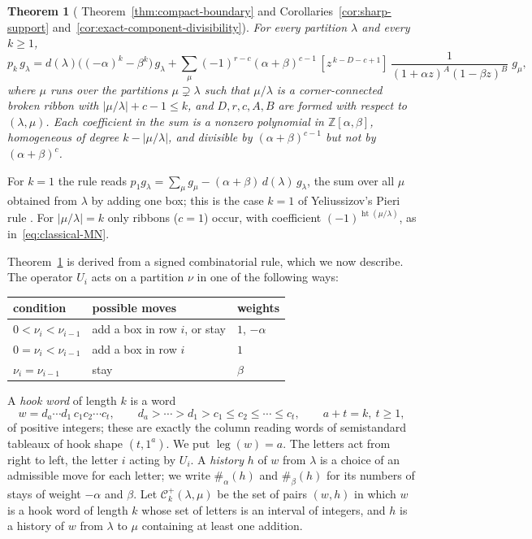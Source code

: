 \documentclass[11pt]{amsart}
\numberwithin{equation}{section}
\newtheorem{maintheorem}{Theorem}
\theoremstyle{definition}
\theoremstyle{remark}
\newcommand{\leg}{\operatorname{leg}}
\newcommand{\hgt}{\operatorname{ht}}
\newcommand{\cC}{\mathcal C}
\newcommand{\ZZ}{\mathbb Z}
\begin{document}
\begin{maintheorem}[
Theorem~\ref{thm:compact-boundary} and
Corollaries~\ref{cor:sharp-support}
and~\ref{cor:exact-component-divisibility}]
\label{thm:A}
For every partition $\lambda$ and every $k\geq1$,
\[
 p_k\,g_\lambda=d(\lambda)\bigl((-\alpha)^k-\beta^k\bigr)\,g_\lambda
 +\sum_\mu(-1)^{r-c}(\alpha+\beta)^{c-1}\,
 [z^{\,k-D-c+1}]\,\frac{1}{(1+\alpha z)^A(1-\beta z)^B}\;g_\mu ,
\]
where $\mu$ runs over the partitions $\mu\supsetneq\lambda$ such that
$\mu/\lambda$ is a corner-connected broken ribbon with
$|\mu/\lambda|+c-1\leq k$, and $D,r,c,A,B$ are formed with respect to
$(\lambda,\mu)$. Each coefficient in the sum is a nonzero polynomial in
$\ZZ[\alpha,\beta]$, homogeneous of degree $k-|\mu/\lambda|$,
and divisible by $(\alpha+\beta)^{c-1}$ but not by
$(\alpha+\beta)^c$.
\end{maintheorem}

For $k=1$ the rule reads
$p_1g_\lambda=\sum_\mu g_\mu-(\alpha+\beta)\,d(\lambda)\,g_\lambda$, the sum
over all $\mu$ obtained from $\lambda$ by adding one box; this is the case
$k=1$ of Yeliussizov's Pieri rule \cite[Prop.~8.12]{Yeliussizov}. For
$|\mu/\lambda|=k$ only ribbons ($c=1$) occur, with coefficient
$(-1)^{\hgt(\mu/\lambda)}$, as in~\eqref{eq:classical-MN}.

Theorem~\ref{thm:A} is derived from a signed combinatorial rule, which we
now describe. The operator $U_i$ acts on a partition $\nu$ in one of the
following ways:
\begin{center}
\renewcommand{\arraystretch}{1.15}
\begin{tabular}{lll}
\toprule
condition & possible moves & weights\\
\midrule
$0<\nu_i<\nu_{i-1}$ & add a box in row $i$, or stay & $1$, $-\alpha$\\
$0=\nu_i<\nu_{i-1}$ & add a box in row $i$ & $1$\\
$\nu_i=\nu_{i-1}$ & stay & $\beta$\\
\bottomrule
\end{tabular}
\end{center}
A \emph{hook word} of length $k$ is a word
\[
 w=d_a\cdots d_1\,c_1c_2\cdots c_t,
 \qquad d_a>\cdots>d_1>c_1\leq c_2\leq\cdots\leq c_t,
 \qquad a+t=k,\ t\geq1,
\]
of positive integers; these are exactly the column reading words of
semistandard tableaux of hook shape $(t,1^a)$. We put $\leg(w)=a$. The
letters act from right to left, the letter $i$ acting by $U_i$. A
\emph{history} $h$ of $w$ from $\lambda$ is a choice of an admissible move
for each letter; 
we write $\#_\alpha(h)$ and $\#_\beta(h)$ for its numbers of
stays of weight $-\alpha$ and $\beta$. Let $\cC^+_k(\lambda,\mu)$ be the set
of pairs $(w,h)$ in which $w$ is a hook word of length $k$ whose set of
letters is an interval of integers, and $h$ is a history of $w$ from
$\lambda$ to $\mu$ containing at least one addition.
\end{document}
